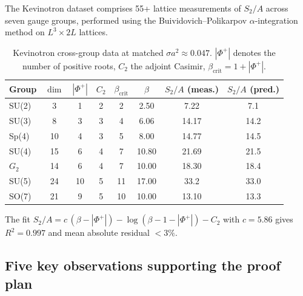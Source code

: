\documentclass[11pt,a4paper]{amsart}
\theoremstyle{definition}
\theoremstyle{remark}
\newcommand{\PhiPlus}{\Phi^+}
\newcommand{\betacrit}{\beta_{\mathrm{crit}}}
\begin{document}
The Kevinotron dataset comprises 55+ lattice measurements of $S_2/A$ across
seven gauge groups, performed using the Buividovich--Polikarpov
$\alpha$-integration method on $L^3 \times 2L$ lattices.

\begin{table}[h]
\centering
\caption{Kevinotron cross-group data at matched $\sigma a^2 \approx 0.047$.
$|\PhiPlus|$ denotes the number of positive roots, $C_2$ the adjoint
Casimir, $\betacrit = 1 + |\PhiPlus|$.}
\label{tab:groups}
\begin{tabular}{lccccccc}
\toprule
Group & $\dim$ & $|\PhiPlus|$ & $C_2$ & $\betacrit$ & $\beta$ & $S_2/A$ (meas.) & $S_2/A$ (pred.) \\
\midrule
SU(2) & 3 & 1 & 2 & 2 & 2.50 & 7.22 & 7.1 \\
SU(3) & 8 & 3 & 3 & 4 & 6.06 & 14.17 & 14.2 \\
Sp(4) & 10 & 4 & 3 & 5 & 8.00 & 14.77 & 14.5 \\
SU(4) & 15 & 6 & 4 & 7 & 10.80 & 21.69 & 21.5 \\
$G_2$ & 14 & 6 & 4 & 7 & 10.00 & 18.30 & 18.4 \\
SU(5) & 24 & 10 & 5 & 11 & 17.00 & 33.2 & 33.0 \\
SO(7) & 21 & 9 & 5 & 10 & 10.00 & 13.10 & 13.3 \\
\bottomrule
\end{tabular}
\end{table}

The fit $S_2/A = c\,(\beta - |\PhiPlus|) - \log(\beta - 1 - |\PhiPlus|) - C_2$
with $c = 5.86$ gives $R^2 = 0.997$ and mean absolute residual $< 3\%$.

\subsection{Five key observations supporting the proof plan}
\end{document}
